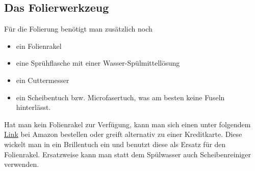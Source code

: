 \subsection{Das Folierwerkzeug}
Für die Folierung benötigt man zusätzlich noch 
\begin{center}
	\begin{singlespace}
		\begin{itemize}
			\item ein Folienrakel
			\item eine Sprühflasche mit einer Wasser-Spülmittellösung
			\item ein Cuttermesser
			\item ein Scheibentuch bzw. Microfasertuch, was am besten keine Fuseln hinterlässt.
		\end{itemize}
	\end{singlespace}
\end{center}
Hat man kein Folienrakel zur Verfügung, kann man sich einen unter folgendem \href{https://www.amazon.de/Folienrakel-Filzkante-Filzrakel-Kunststoffrakel-Verkleberakel/dp/B073S7KT25/ref=sr_1_2?ie=UTF8&qid=1503417838&sr=8-2&keywords=werkzeug+folierung}{Link} bei Amazon bestellen oder greift alternativ zu einer Kreditkarte. Diese wickelt man in ein Brillentuch ein und benutzt diese als Ersatz für den Folienrakel. Ersatzweise kann man statt dem Spülwasser auch Scheibenreiniger verwenden.

\newpage
